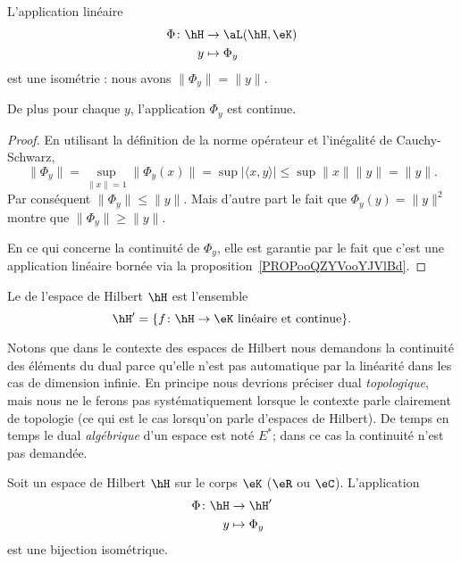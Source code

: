 \begin{lemma}       \label{LemjYVcHE}
    L'application linéaire
    \begin{equation}
        \begin{aligned}
            \Phi\colon \hH&\to \aL(\hH,\eK) \\
            y&\mapsto \Phi_y 
        \end{aligned}
    \end{equation}
    est une isométrie : nous avons \( \| \Phi_y \|=\| y \|\). 
    
    De plus pour chaque \( y\), l'application \( \Phi_y\) est continue.
\end{lemma}

\begin{proof}
    En utilisant la définition de la norme opérateur et l'inégalité de Cauchy-Schwarz,
    \begin{equation}
        \| \Phi_y \|=\sup_{\| x \| =1}\| \Phi_y(x) \|=\sup| \langle x, y\rangle  |\leq\sup\| x \|\| y \|=\| y \|.
    \end{equation}
    Par conséquent \( \| \Phi_y \|\leq\| y \|\). Mais d'autre part le fait que \( \Phi_y(y)=\| y \|^2\) montre que \( \| \Phi_y \|\geq \| y \|\).

    En ce qui concerne la continuité de \( \Phi_y\), elle est garantie par le fait que c'est une application linéaire bornée via la proposition~\ref{PROPooQZYVooYJVlBd}.
\end{proof}

\begin{definition}
    Le  de l'espace de Hilbert \( \hH\) est l'ensemble
    \begin{equation}
        \hH'=\{ f\colon \hH\to \eK\text{ linéaire et continue} \}.
    \end{equation}
\end{definition}
Notons que dans le contexte des espaces de Hilbert nous demandons la continuité des éléments du dual parce qu'elle n'est pas automatique par la linéarité dans les cas de dimension infinie. En principe nous devrions préciser dual \emph{topologique}, mais nous ne le ferons pas systématiquement lorsque le contexte parle clairement de topologie (ce qui est le cas lorsqu'on parle d'espaces de Hilbert). De temps en temps le dual \emph{algébrique} d'un espace est noté \( E^*\); dans ce cas la continuité n'est pas demandée.

\begin{theorem}        \label{ThoQgTovL}
    Soit un espace de Hilbert \( \hH\) sur le corps \( \eK\) (\( \eR\) ou \( \eC\)). L'application
    \begin{equation}
        \begin{aligned}
            \Phi\colon \hH&\to \hH' \\
            y&\mapsto \Phi_y
        \end{aligned}
    \end{equation}
    est une bijection isométrique.
\end{theorem}

